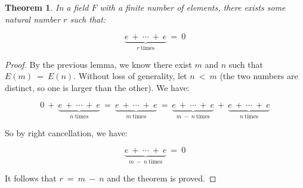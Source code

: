 \documentclass[10pt, oneside]{article}
\newtheorem{thm}{Theorem}
\begin{document}
\begin{thm}
  In a field $F$ with a finite number of elements, there exists some natural number $r$ such that:

  $$\underbrace{e \ + \ \cdots \ + \ e}_{r \ \text{times}} \ = \ 0$$
\end{thm}

\begin{proof}
  By the previous lemma, we know there exist $m$ and $n$ such that $E(m) \ = \ E(n)$. Without loss of generality, let $n \ < \ m$ (the two numbers
  are distinct, so one is larger than the other). We have:

  $$0 \ + \ \underbrace{e \ + \ \cdots \ + \ e}_{n \ \text{times}} \ = \ \underbrace{e \ + \ \cdots \ + \ e}_{m \ \text{times}} \ = \ \underbrace{e \ + \ \cdots \ + \ e}_{m \ - \ n \ \text{times}} \ + \
  \underbrace{e \ + \ \cdots \ + \ e}_{n \ \text{times}}$$

  So by right cancellation, we have:

  $$\underbrace{e \ + \ \cdots \ + \ e}_{m \ - \ n \ \text{times}} \ = \ 0$$

  It follows that $r \ = \ m \ - \ n$ and the theorem is proved.
  \end{proof}
\end{document}
